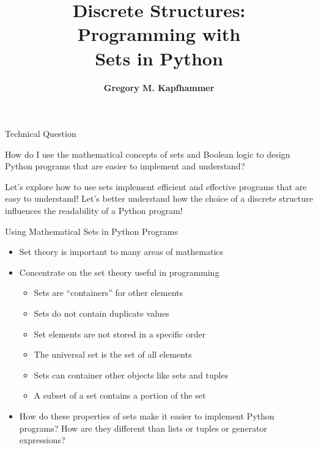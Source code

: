 \documentclass[14pt,aspectratio=169]{beamer}
\title{Discrete Structures: \\ Programming with \\ Sets in Python}
\author{{\bf Gregory M. Kapfhammer}}
\institute[shortinst]{{\bf Department of Computer Science, Allegheny College}}
\begin{document}
{
  \begin{frame}
    \titlepage
  \end{frame}
}

%
\begin{frame}{Technical Question}
  \hspace*{.5in}
  \begin{minipage}{4.3in}
    \vspace*{.1in}
    \begin{center}
      {\large How do I use the mathematical concepts of sets and Boolean logic
      to design Python programs that are easier to implement and understand?}
    \end{center}
  \end{minipage}
  \vspace{2ex}
  \begin{center}
    \small Let's explore how to use sets implement efficient and effective
    programs that are easy to understand! Let's better understand how the choice
    of a discrete structure influences the readability of a Python program!
  \end{center}
\end{frame}

%
\begin{frame}{Using Mathematical Sets in Python Programs}
  \begin{itemize}
    \item Set theory is important to many areas of mathematics
      \vspace*{-.15in}
    \item Concentrate on the set theory useful in programming
      \begin{itemize}
        \item Sets are ``containers'' for other elements
        \item Sets do not contain duplicate values
        \item Set elements are not stored in a specific order
        \item The universal set is the set of all elements
        \item Sets can container other objects like sets and tuples
        \item A subset of a set contains a portion of the set
      \end{itemize}
      \vspace*{-.2in}
    \item How do these properties of sets make it easier to implement Python
      programs? How are they different than lists or tuples or generator
      expressions?
  \end{itemize}
\end{frame}
\end{document}
